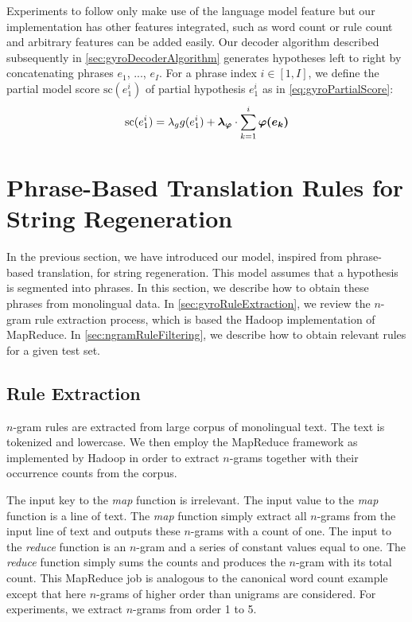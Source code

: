 %
Experiments to follow only make use of the language model feature but
our implementation has other features integrated, such as
word count or rule count and arbitrary features can be added easily.
Our decoder algorithm described subsequently in
\autoref{sec:gyroDecoderAlgorithm} generates hypotheses left to right
by concatenating phrases $e_1$, ..., $e_I$. For a phrase index $i \in [1, I]$,
we define the partial model score $\text{sc}(e_1^i)$ of partial hypothesis $e_1^i$ as
in \autoref{eq:gyroPartialScore}:
%
\begin{equation}
  \text{sc}(e_1^i) = \lambda_g g(e_1^i) + \bm{\lambda_{\varphi}} \cdot \sum_{k = 1}^i \bm{\varphi(e_k)} \\
  \label{eq:gyroPartialScore}
\end{equation}

\section{Phrase-Based Translation Rules for String Regeneration}
\label{sec:gyroPhraseBasedRules}

In the previous section, we have introduced our model, inspired from
phrase-based translation, for string regeneration.
This model assumes that a hypothesis is segmented into phrases.
In this section, we describe how to obtain these phrases
from monolingual data. In \autoref{sec:gyroRuleExtraction}, we review
the $n$-gram rule extraction process, which is based the Hadoop implementation
of MapReduce. In \autoref{sec:ngramRuleFiltering}, we describe how to obtain
relevant rules for a given test set.

\subsection{Rule Extraction}
\label{sec:gyroRuleExtraction}

$n$-gram rules are extracted from large corpus of monolingual
text. The text is tokenized and lowercase. We then
employ the MapReduce
framework as implemented by Hadoop in order to extract %
$n$-grams together with their occurrence counts from the corpus.

The input key to the \emph{map} function is irrelevant.
The input value to the \emph{map} function is a line of text.
The \emph{map} function simply extract all $n$-grams from the
input line of text and outputs these $n$-grams with a count of
one. The input to the \emph{reduce} function is an $n$-gram
and a series of constant values equal to one.
The \emph{reduce} function simply sums the counts
and produces the $n$-gram with its total count. This MapReduce
job is analogous to the canonical word count example except
that here $n$-grams of higher order than unigrams are considered.
For experiments, we extract $n$-grams from order 1 to 5. %

